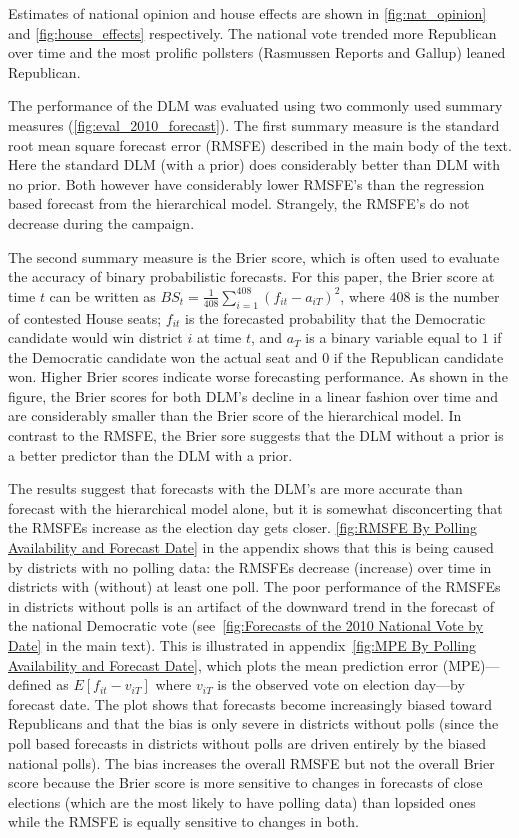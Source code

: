 \documentclass[12pt,final,fleqn]{article}
\theoremstyle{plain}
\begin{document}
Estimates of national opinion and house effects are shown in \autoref{fig:nat_opinion} and \autoref{fig:house_effects} respectively. The national vote trended more Republican over time and the most prolific pollsters (Rasmussen Reports and Gallup) leaned Republican.  

The performance of the DLM was evaluated using two commonly used summary measures (\autoref{fig:eval_2010_forecast}). The first summary measure is the standard root mean square forecast error (RMSFE) described in the main body of the text. Here the standard DLM (with a prior) does considerably better than DLM with no prior. Both however have considerably lower RMSFE's than the regression based forecast from the hierarchical model. Strangely, the RMSFE's do not decrease during the campaign.

The second summary measure is the Brier score, which is often used to evaluate the accuracy of binary probabilistic forecasts. For this paper, the Brier score at time $t$ can be written as $BS_t = \frac{1}{408} \sum_{i=1}^{408}(f_{it} - a_{iT})^2$, where $408$ is the number of contested House seats; $f_{it}$ is the forecasted probability that the Democratic candidate would win district $i$ at time $t$, and $a_T$ is a binary variable equal to $1$ if the Democratic candidate won the actual seat and $0$ if the Republican candidate won. Higher Brier scores indicate worse forecasting performance. As shown in the figure, the Brier scores for both DLM's decline in a linear fashion over time and are considerably smaller than the Brier score of the hierarchical model. In contrast to the RMSFE, the Brier sore suggests that the DLM without a prior is a better predictor than the DLM with a prior. 

The results suggest that forecasts with the DLM's are more accurate than forecast with the hierarchical model alone, but it is somewhat disconcerting that the RMSFEs increase as the election day gets closer. \autoref{fig:RMSFE By Polling Availability and Forecast Date} in the appendix shows that this is being caused by districts with no polling data: the RMSFEs decrease (increase) over time in districts with (without) at least one poll. The poor performance of the RMSFEs in districts without polls is an artifact of the downward trend in the forecast of the national Democratic vote (see~\autoref*{fig:Forecasts of the 2010 National Vote by Date} in the main text). This is illustrated in appendix~\autoref{fig:MPE By Polling Availability and Forecast Date}, which plots the mean prediction error (MPE)---defined as $E[f_{it}-v_{iT}]$ where $v_{iT}$ is the observed vote on election day---by forecast date. The plot shows that forecasts become increasingly biased toward Republicans and that the bias is only severe in districts without polls (since the poll based forecasts in districts without polls are driven entirely by the biased national polls). The bias increases the overall RMSFE but not the overall Brier score because the Brier score is more sensitive to changes in forecasts of close elections (which are the most likely to have polling data) than lopsided ones while the RMSFE is equally sensitive to changes in both.
\end{document}
